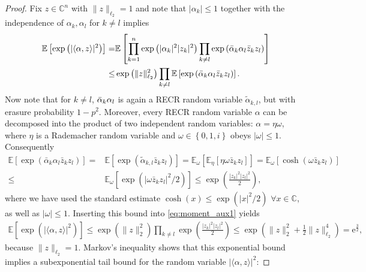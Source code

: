 \begin{proof}
Fix $ z \in \mathbb{C}^n$ with $\|  z \|_{\ell_2}=1$ and note that $|\alpha_k| \leq 1$ together with the independence of $\alpha_k,\alpha_l$ for $k \neq l$ implies
\begin{align}
  \mathbb{E} \left[ \exp \left( | \langle \alpha,  z \rangle|^2 \right) \right]
  =& \mathbb{E} \left[ \prod_{k=1}^n \exp \left( | \alpha_k|^2 |z_k|^2 \right) \prod_{k \neq l} \exp \left( \bar{\alpha}_k \alpha_l \bar{z}_k z_l \right) \right] \nonumber \\
  \leq& \exp \left( \|  z \|_{\ell_2}^2 \right) \prod_{k \neq l} \mathbb{E} \left[  \exp \left( \bar{\alpha}_k \alpha_l \bar{z}_k z_l \right)  \right]. \label{eq:moment_aux1}
\end{align}
Now note that for $k \neq l$, $\bar{\alpha}_k \alpha_l$ is again a RECR random variable $\tilde{\alpha}_{k,l}$, but with erasure probability $1-p^2$.
Moreover, every RECR random variable $\alpha$ can be decomposed into the product of two independent random variables: $ \alpha= \eta \omega$, where $\eta$ is a Rademacher random variable and $\omega \in \left\{0, 1,i \right\}$ obeys $| \omega | \leq 1$.
Consequently
\begin{align}
  \mathbb{E} \left[ \exp \left( \bar{\alpha}_k \alpha_l \bar{z}_k z_l \right) \right]
  =& \mathbb{E} \left[ \exp \left( \tilde{\alpha}_{k,l} \bar{z}_k z_l \right) \right]
  = \mathbb{E}_{\omega} \left[ \mathbb{E}_\eta \left[ \eta \omega \bar{z}_k  z_l \right] \right]
  = \mathbb{E}_{\omega} \left[ \cosh \left( \omega \bar{z}_k z_l \right) \right] \\
  \leq & \mathbb{E}_\omega \left[ \exp \left( |\omega \bar{z}_k z_l|^2/2 \right) \right]
  \leq  \exp \left( \frac{|z_k|^2 |z_l|^2}{2} \right),
\end{align}
where we have used the standard estimate $\cosh (x) \leq \exp \left( |x|^2/2 \right)$ $\forall x \in \mathbb{C}$, as well as $| \omega| \leq 1$. Inserting this bound into \eqref{eq:moment_aux1} yields
\begin{align}
  \mathbb{E} \left[ \exp \left( | \langle  \alpha,  z \rangle|^2 \right) \right]
  \leq \exp \left( \|  z \|_2^2 \right) \prod_{k \neq l} \exp \left( \frac{|z_k|^2 |z_l|^2}{2} \right)
  \leq \exp \left( \|  z \|_2^2 + \frac{1}{2}\|  z \|_{\ell_2}^4 \right) = \mathrm{e}^{\frac{3}{2}},
\end{align}
because $\|  z \|_{\ell_2}=1$.
Markov's inequality shows that this exponential bound implies a subexponential tail bound for the random variable $| \langle  \alpha, z \rangle|^2$:

\end{proof}
